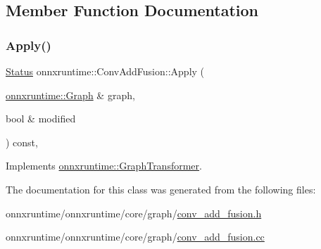 \subsection{Member Function Documentation}
\mbox{\label{classonnxruntime_1_1ConvAddFusion_aacc7121b10b0bb9744117b7b227fdcb3}} 
\subsubsection{\texorpdfstring{Apply()}{Apply()}}
{\footnotesize\ttfamily \mbox{\hyperlink{classonnxruntime_1_1common_1_1Status}{Status}} onnxruntime\+::\+Conv\+Add\+Fusion\+::\+Apply (\begin{DoxyParamCaption}\item[{\mbox{\hyperlink{classonnxruntime_1_1Graph}{onnxruntime\+::\+Graph}} \&}]{graph,  }\item[{bool \&}]{modified }\end{DoxyParamCaption}) const\hspace{0.3cm}{\ttfamily [override]}, {\ttfamily [virtual]}}



Implements \mbox{\hyperlink{classonnxruntime_1_1GraphTransformer_a690d351da797884409b1d7aa584e33b5}{onnxruntime\+::\+Graph\+Transformer}}.



The documentation for this class was generated from the following files\+:\begin{DoxyCompactItemize}
\item 
onnxruntime/onnxruntime/core/graph/\mbox{\hyperlink{conv__add__fusion_8h}{conv\+\_\+add\+\_\+fusion.\+h}}\item 
onnxruntime/onnxruntime/core/graph/\mbox{\hyperlink{conv__add__fusion_8cc}{conv\+\_\+add\+\_\+fusion.\+cc}}\end{DoxyCompactItemize}
